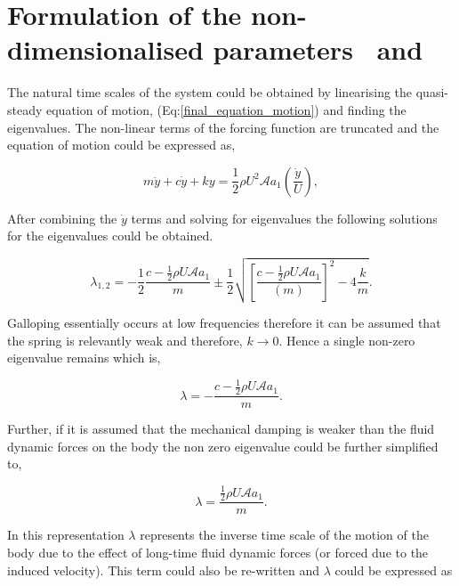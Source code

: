 \section{Formulation of the non-dimensionalised parameters \massstiff \ and \massdamp }
\label{sec: pi_1,pi_2_formulation}



The natural time scales of the system could be obtained by linearising the quasi-steady equation of motion, (Eq:\ref{final_equation_motion}) and finding the eigenvalues. The non-linear terms of the forcing function are truncated and the equation of motion could be expressed as, 

\begin{equation}
\label{eqn:eom_linear}
m\ddot{y}{+}c\dot{y}{+}ky{=}\frac{1}{2}\rho U^2 \mathcal{A} a_1\left(\frac{\dot{y}}{U}\right),
\end{equation}

After combining the $\dot{y}$ terms and solving for eigenvalues the following solutions for the eigenvalues could be obtained. 

 \begin{equation}
 \label{eqn:eigs}
 \lambda_{1,2}= -\frac{1}{2}\frac{c-\frac{1}{2}\rho U\mathcal{A}a_1}{m}\pm\frac{1}{2}\sqrt{\left[\frac{c-\frac{1}{2}\rho U\mathcal{A}a_1}{(m)}\right]^2-4\frac{k}{m}}.
 \end{equation} 
 
 Galloping essentially occurs at low frequencies therefore it can be assumed that the spring is relevantly weak and therefore, $k \rightarrow 0$. Hence a single non-zero eigenvalue remains which is, 
  
  \begin{equation}
  \label{eqn:eigs_nospring}
  \lambda=-\frac{c-\frac{1}{2}\rho U\mathcal{A}a_1}{m}.
  \end{equation}
  
  Further, if it is assumed that the mechanical damping is weaker than the fluid dynamic forces on the body the non zero eigenvalue could be further simplified to,
  
 \begin{equation}
 \label{eqn:eigs_nospring_nodamp}
 \lambda=\frac{\frac{1}{2}\rho U\mathcal{A}a_1}{m}.
 \end{equation}  

In this representation $\lambda$ represents the inverse time scale of the motion of the body due to the effect of long-time fluid dynamic forces (or forced due to the induced velocity). This term could also be re-written and $\lambda$ could be expressed as 


